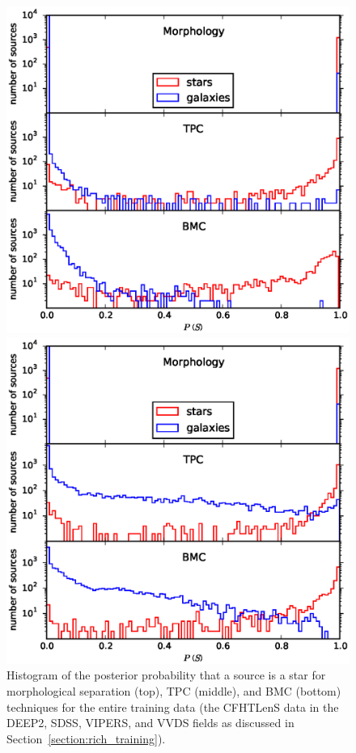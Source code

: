 \documentclass[useAMS,usenatbib]{mn2e}
\begin{document}
\begin{figure}
  \begin{minipage}[t]{0.49\linewidth}
    \includegraphics[width=\textwidth]{figures/p_dist_all.eps}
    \caption{Histogram of the posterior probability that
             a source is a star for morphological separation (top),
             TPC (middle), and BMC (bottom) techniques
             for the entire training data
             (the CFHTLenS data in the DEEP2, SDSS, VIPERS, and VVDS
             fields as discussed in Section~\ref{section:rich_training}).}
    \label{fig:p_dist_all}
  \end{minipage}
  \hfill
  \begin{minipage}[t]{0.49\linewidth}
    \includegraphics[width=\textwidth]{figures/p_dist_cut.eps}

\end{minipage}
\end{figure}
\end{document}
